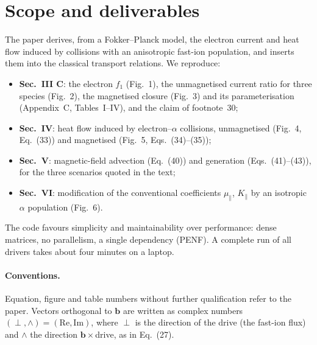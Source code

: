 \documentclass[11pt,a4paper]{article}
\begin{document}
\tableofcontents

\section{Scope and deliverables}\label{sec:scope}
The paper derives, from a Fokker--Planck model, the electron current and heat flow induced by collisions with an
anisotropic fast-ion population, and inserts them into the classical transport relations. We reproduce:
\begin{itemize}
   \item \textbf{Sec.~III C}: the electron $f_1$ (Fig.~1), the unmagnetised current ratio for three species (Fig.~2), the
         magnetised closure (Fig.~3) and its parameterisation (Appendix~C, Tables~I--IV), and the claim of footnote~30;
   \item \textbf{Sec.~IV}: heat flow induced by electron--$\alpha$ collisions, unmagnetised (Fig.~4, Eq.~(33)) and
         magnetised (Fig.~5, Eqs.~(34)--(35));
   \item \textbf{Sec.~V}: magnetic-field advection (Eq.~(40)) and generation (Eqs.~(41)--(43)), for the three scenarios
         quoted in the text;
   \item \textbf{Sec.~VI}: modification of the conventional coefficients $\mu_\parallel$, $K_\parallel$ by an isotropic
         $\alpha$ population (Fig.~6).
\end{itemize}
The code favours simplicity and maintainability over performance: dense matrices, no parallelism, a single
dependency (PENF). A complete run of all drivers takes about four minutes on a laptop.

\paragraph{Conventions.} Equation, figure and table numbers without further qualification refer to the paper. Vectors
orthogonal to $\mathbf b$ are written as complex numbers $(\perp,\wedge)=(\mathrm{Re},\mathrm{Im})$, where $\perp$ is the
direction of the drive (the fast-ion flux) and $\wedge$ the direction $\mathbf b\times$drive, as in Eq.~(27).

\end{document}
